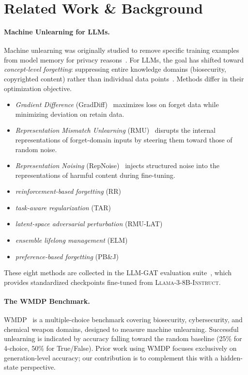 \section{Related Work \& Background}
\label{sec:related}

\paragraph{Machine Unlearning for LLMs.}
Machine unlearning was originally studied to remove specific training examples from
model memory for privacy reasons~\citep{cao2015towards}.
For LLMs, the goal has shifted toward \emph{concept-level forgetting}: suppressing
entire knowledge domains (biosecurity, copyrighted content) rather than individual
data points~\citep{liu2024rethinking}.
Methods differ in their optimization objective.
\begin{itemize}[leftmargin=1.5em, itemsep=2pt]
\item\emph{Gradient Difference} (GradDiff)~\citep{yao2023large} maximizes loss on forget
data while minimizing deviation on retain data.
\item\emph{Representation Mismatch Unlearning} (RMU)~\citep{li2024wmdp} disrupts the
internal representations of forget-domain inputs by steering them toward those of
random noise.
\item\emph{Representation Noising} (RepNoise)~\citep{rosati2024representation} injects
structured noise into the representations of harmful content during fine-tuning.
\item\emph{reinforcement-based forgetting} (RR)
\item\emph{task-aware regularization} (TAR)
\item\emph{latent-space adversarial perturbation} (RMU-LAT)
\item\emph{ensemble lifelong management} (ELM) 
\item\emph{preference-based forgetting} (PB\&J)
\end{itemize}
These eight methods are collected in the LLM-GAT evaluation suite~\citep{llmgat2024},
which provides standardized checkpoints fine-tuned from \textsc{Llama-3-8B-Instruct}.

\paragraph{The WMDP Benchmark.}
WMDP~\citep{li2024wmdp} is a multiple-choice benchmark covering biosecurity,
cybersecurity, and chemical weapon domains, designed to measure machine unlearning.
Successful unlearning is indicated by accuracy falling toward the random baseline
(25\% for 4-choice, 50\% for True/False).
Prior work using WMDP focuses exclusively on generation-level accuracy;
our contribution is to complement this with a hidden-state perspective.

